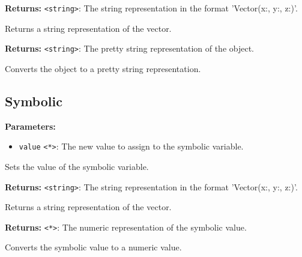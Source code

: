 \documentclass[12pt,a4paper]{article}
\begin{document}
\noindent \textbf{Returns:} \texttt{<string>}: The string representation in the format 'Vector(x:, y:, z:)'.

\noindent Returns a string representation of the vector.

\vspace{5mm}
\noindent {}


\noindent \textbf{Returns:} \texttt{<string>}: The pretty string representation of the object.

\noindent Converts the object to a pretty string representation.


\subsection{Symbolic}
\vspace{5mm}
\noindent {}


\noindent \textbf{Parameters:}
\begin{itemize}
  \item \texttt{value} \texttt{<*>}: The new value to assign to the symbolic variable.
\end{itemize}

\noindent Sets the value of the symbolic variable.

\vspace{5mm}
\noindent {}


\noindent \textbf{Returns:} \texttt{<string>}: The string representation in the format 'Vector(x:, y:, z:)'.

\noindent Returns a string representation of the vector.

\vspace{5mm}
\noindent {}


\noindent \textbf{Returns:} \texttt{<*>}: The numeric representation of the symbolic value.

\noindent Converts the symbolic value to a numeric value.
\end{document}
